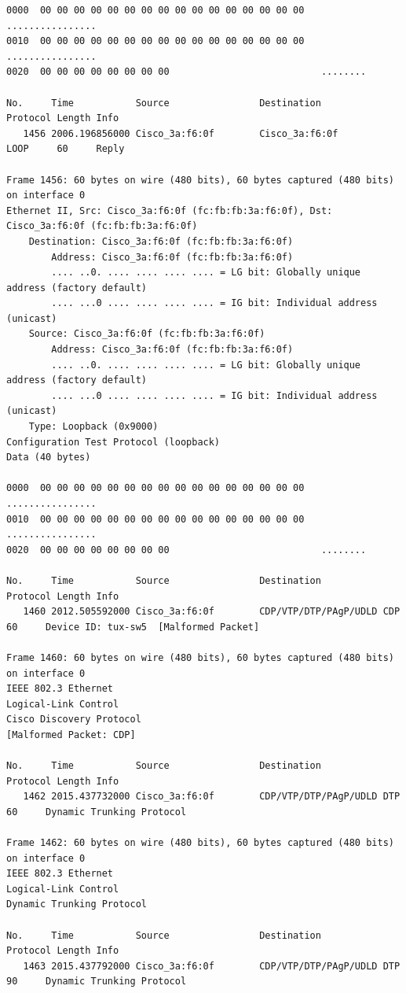 \documentclass[a4paper,11pt]{article}
\begin{document}
\begin{lstlisting}
0000  00 00 00 00 00 00 00 00 00 00 00 00 00 00 00 00   ................
0010  00 00 00 00 00 00 00 00 00 00 00 00 00 00 00 00   ................
0020  00 00 00 00 00 00 00 00                           ........

No.     Time           Source                Destination           Protocol Length Info
   1456 2006.196856000 Cisco_3a:f6:0f        Cisco_3a:f6:0f        LOOP     60     Reply

Frame 1456: 60 bytes on wire (480 bits), 60 bytes captured (480 bits) on interface 0
Ethernet II, Src: Cisco_3a:f6:0f (fc:fb:fb:3a:f6:0f), Dst: Cisco_3a:f6:0f (fc:fb:fb:3a:f6:0f)
    Destination: Cisco_3a:f6:0f (fc:fb:fb:3a:f6:0f)
        Address: Cisco_3a:f6:0f (fc:fb:fb:3a:f6:0f)
        .... ..0. .... .... .... .... = LG bit: Globally unique address (factory default)
        .... ...0 .... .... .... .... = IG bit: Individual address (unicast)
    Source: Cisco_3a:f6:0f (fc:fb:fb:3a:f6:0f)
        Address: Cisco_3a:f6:0f (fc:fb:fb:3a:f6:0f)
        .... ..0. .... .... .... .... = LG bit: Globally unique address (factory default)
        .... ...0 .... .... .... .... = IG bit: Individual address (unicast)
    Type: Loopback (0x9000)
Configuration Test Protocol (loopback)
Data (40 bytes)

0000  00 00 00 00 00 00 00 00 00 00 00 00 00 00 00 00   ................
0010  00 00 00 00 00 00 00 00 00 00 00 00 00 00 00 00   ................
0020  00 00 00 00 00 00 00 00                           ........

No.     Time           Source                Destination           Protocol Length Info
   1460 2012.505592000 Cisco_3a:f6:0f        CDP/VTP/DTP/PAgP/UDLD CDP      60     Device ID: tux-sw5  [Malformed Packet]

Frame 1460: 60 bytes on wire (480 bits), 60 bytes captured (480 bits) on interface 0
IEEE 802.3 Ethernet 
Logical-Link Control
Cisco Discovery Protocol
[Malformed Packet: CDP]

No.     Time           Source                Destination           Protocol Length Info
   1462 2015.437732000 Cisco_3a:f6:0f        CDP/VTP/DTP/PAgP/UDLD DTP      60     Dynamic Trunking Protocol

Frame 1462: 60 bytes on wire (480 bits), 60 bytes captured (480 bits) on interface 0
IEEE 802.3 Ethernet 
Logical-Link Control
Dynamic Trunking Protocol

No.     Time           Source                Destination           Protocol Length Info
   1463 2015.437792000 Cisco_3a:f6:0f        CDP/VTP/DTP/PAgP/UDLD DTP      90     Dynamic Trunking Protocol


\end{lstlisting}
\end{document}
